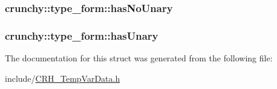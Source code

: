 \subsubsection[{has\+No\+Unary}]{ crunchy\+::type\+\_\+form\+::has\+No\+Unary}\label{structcrunchy_1_1type__form_a5941739fb7b37a91b52fe240614aa388}
\hypertarget{structcrunchy_1_1type__form_a78a0fdae7e17412ea3a5374fa7d0925c}{}
\subsubsection[{has\+Unary}]{ crunchy\+::type\+\_\+form\+::has\+Unary}\label{structcrunchy_1_1type__form_a78a0fdae7e17412ea3a5374fa7d0925c}


The documentation for this struct was generated from the following file\+:\begin{DoxyCompactItemize}
\item 
include/\hyperlink{_c_r_h___temp_var_data_8h}{C\+R\+H\+\_\+\+Temp\+Var\+Data.\+h}\end{DoxyCompactItemize}
